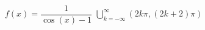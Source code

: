{ $f(x) = \dfrac{1}{\cos(x) - 1}$ }
{ $\displaystyle \bigcup_{k=-\infty}^{\infty} \left( 2k\pi, (2k+2)\pi \right)$}
